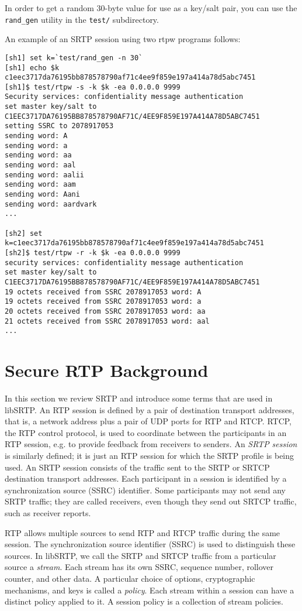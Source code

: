 In order to get a random 30-byte value for use as a key/salt pair, you
can use the \texttt{rand\_gen} utility in the \texttt{test/}
subdirectory.

An example of an SRTP session using two rtpw programs follows:

\begin{verbatim}
[sh1] set k=`test/rand_gen -n 30`
[sh1] echo $k
c1eec3717da76195bb878578790af71c4ee9f859e197a414a78d5abc7451
[sh1]$ test/rtpw -s -k $k -ea 0.0.0.0 9999 
Security services: confidentiality message authentication
set master key/salt to C1EEC3717DA76195BB878578790AF71C/4EE9F859E197A414A78D5ABC7451
setting SSRC to 2078917053
sending word: A
sending word: a
sending word: aa
sending word: aal
sending word: aalii
sending word: aam
sending word: Aani
sending word: aardvark
...

[sh2] set k=c1eec3717da76195bb878578790af71c4ee9f859e197a414a78d5abc7451
[sh2]$ test/rtpw -r -k $k -ea 0.0.0.0 9999 
security services: confidentiality message authentication
set master key/salt to C1EEC3717DA76195BB878578790AF71C/4EE9F859E197A414A78D5ABC7451
19 octets received from SSRC 2078917053 word: A
19 octets received from SSRC 2078917053 word: a
20 octets received from SSRC 2078917053 word: aa
21 octets received from SSRC 2078917053 word: aal
...
\end{verbatim}


\hypertarget{main_Review}{}\section{Secure RTP Background}\label{main_Review}
In this section we review SRTP and introduce some terms that are used in libSRTP. An RTP session is defined by a pair of destination transport addresses, that is, a network address plus a pair of UDP ports for RTP and RTCP. RTCP, the RTP control protocol, is used to coordinate between the participants in an RTP session, e.g. to provide feedback from receivers to senders. An {\itshape SRTP\/} {\itshape session\/} is similarly defined; it is just an RTP session for which the SRTP profile is being used. An SRTP session consists of the traffic sent to the SRTP or SRTCP destination transport addresses. Each participant in a session is identified by a synchronization source (SSRC) identifier. Some participants may not send any SRTP traffic; they are called receivers, even though they send out SRTCP traffic, such as receiver reports.

RTP allows multiple sources to send RTP and RTCP traffic during the same session. The synchronization source identifier (SSRC) is used to distinguish these sources. In libSRTP, we call the SRTP and SRTCP traffic from a particular source a {\itshape stream\/}. Each stream has its own SSRC, sequence number, rollover counter, and other data. A particular choice of options, cryptographic mechanisms, and keys is called a {\itshape policy\/}. Each stream within a session can have a distinct policy applied to it. A session policy is a collection of stream policies.

